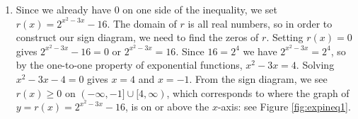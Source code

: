 {
\begin{enumerate}

\item  Since we already have $0$ on one side of the inequality, we set $r(x) = 2^{x^2-3x} - 16$.  The domain of $r$ is all real numbers, so in order to construct our sign diagram, we need to find the zeros of $r$.  Setting $r(x) = 0$ gives $2^{x^2-3x} - 16 = 0$ or $2^{x^2-3x} = 16$.  Since $16 = 2^{4}$ we have $2^{x^2-3x} = 2^{4}$, so by the one-to-one property of exponential functions, $x^2 -3x = 4$.  Solving $x^2 -3x - 4 = 0$ gives $x=4$ and $x=-1$.  From the sign diagram, we see $r(x) \geq 0$ on $(-\infty, -1] \cup [4, \infty)$, which corresponds to where the graph of  $y=r(x) = 2^{x^2-3x} - 16$, is on or above the $x$-axis: see Figure \ref{fig:expineq1}.



\end{enumerate}}
